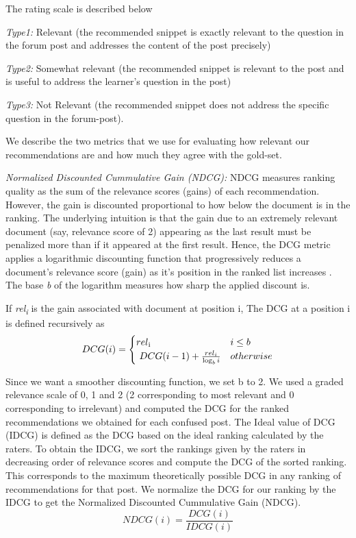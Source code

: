 \documentclass{edm_template}
\begin{document}
The rating scale is described below

\textit{Type1:} Relevant (the recommended snippet is exactly relevant to the question in the forum post and addresses the content of the post precisely)

\textit{Type2:} Somewhat relevant (the recommended snippet is relevant to the post and is useful to address the learner's question in the post) 

\textit{Type3:} Not Relevant (the recommended snippet does not address the specific question in the forum-post).

We describe the two metrics that we use for evaluating how relevant our recommendations are and how much they agree with the gold-set.

\textit{Normalized Discounted Cummulative Gain (NDCG):}
NDCG measures ranking quality as the sum of the relevance scores (gains) of each recommendation. However, the gain is discounted proportional to how below the document is in the ranking. The underlying intuition is that the gain due to an extremely relevant document (say, relevance score of 2) appearing as the last result must be penalized more than if it appeared at the first result. Hence, the DCG metric applies a logarithmic discounting function that progressively reduces a document's relevance score (gain) as it's position in the ranked list increases \cite{ndcgcite}. The base \textit{b} of the logarithm measures how sharp the applied discount is.

If \textit{rel\textsubscript i} is the gain associated with document at position i, The DCG at a position i is defined recursively as
\begin{equation}
DCG(i) =
\begin{cases}
rel \textsubscript i & i \le b  \\
\ DCG(i-1) + \frac{rel_i}{\log_b{i}} & otherwise \\
\end{cases}
\end{equation}

Since we want a smoother discounting function, we set b to 2. We used a graded relevance scale of 0, 1 and 2 (2 corresponding to most relevant and 0 corresponding to irrelevant) and computed the DCG for the ranked recommendations we obtained for each confused post. The Ideal value of DCG (IDCG) is defined as the DCG based on the ideal ranking calculated by the raters. To obtain the IDCG, we sort the rankings given by the raters in decreasing order of relevance scores and compute the DCG of the sorted ranking. This corresponds to the maximum theoretically possible DCG in any ranking of recommendations for that post. We normalize the DCG for our ranking by the IDCG to get the Normalized Discounted Cummulative Gain (NDCG).
\begin{equation}
NDCG(i) = \frac{DCG(i)}{IDCG(i)}
\end{equation}
\end{document}
